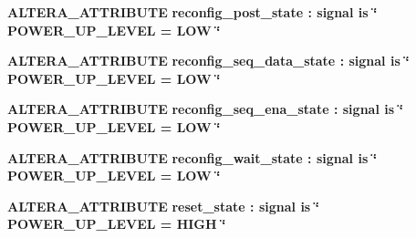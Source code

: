 \begin{DoxyCompactItemize}
\item 
{\bf A\+L\+T\+E\+R\+A\+\_\+\+A\+T\+T\+R\+I\+B\+U\+TE} {\bfseries {\bfseries {\bf reconfig\+\_\+post\+\_\+state}} \textcolor{vhdlchar}{ }\textcolor{vhdlchar}{\+:}\textcolor{vhdlchar}{ }\textcolor{keywordflow}{signal}\textcolor{vhdlchar}{ }\textcolor{keywordflow}{is}\textcolor{vhdlchar}{ }\textcolor{vhdlchar}{ }\textcolor{vhdlchar}{ }\textcolor{vhdlchar}{ }\textcolor{keyword}{\char`\"{} P\+O\+W\+E\+R\+\_\+\+U\+P\+\_\+\+L\+E\+V\+E\+L = L\+O\+W \char`\"{}}\textcolor{vhdlchar}{ }} 
\item 
{\bf A\+L\+T\+E\+R\+A\+\_\+\+A\+T\+T\+R\+I\+B\+U\+TE} {\bfseries {\bfseries {\bf reconfig\+\_\+seq\+\_\+data\+\_\+state}} \textcolor{vhdlchar}{ }\textcolor{vhdlchar}{\+:}\textcolor{vhdlchar}{ }\textcolor{keywordflow}{signal}\textcolor{vhdlchar}{ }\textcolor{keywordflow}{is}\textcolor{vhdlchar}{ }\textcolor{vhdlchar}{ }\textcolor{vhdlchar}{ }\textcolor{vhdlchar}{ }\textcolor{keyword}{\char`\"{} P\+O\+W\+E\+R\+\_\+\+U\+P\+\_\+\+L\+E\+V\+E\+L = L\+O\+W \char`\"{}}\textcolor{vhdlchar}{ }} 
\item 
{\bf A\+L\+T\+E\+R\+A\+\_\+\+A\+T\+T\+R\+I\+B\+U\+TE} {\bfseries {\bfseries {\bf reconfig\+\_\+seq\+\_\+ena\+\_\+state}} \textcolor{vhdlchar}{ }\textcolor{vhdlchar}{\+:}\textcolor{vhdlchar}{ }\textcolor{keywordflow}{signal}\textcolor{vhdlchar}{ }\textcolor{keywordflow}{is}\textcolor{vhdlchar}{ }\textcolor{vhdlchar}{ }\textcolor{vhdlchar}{ }\textcolor{vhdlchar}{ }\textcolor{keyword}{\char`\"{} P\+O\+W\+E\+R\+\_\+\+U\+P\+\_\+\+L\+E\+V\+E\+L = L\+O\+W \char`\"{}}\textcolor{vhdlchar}{ }} 
\item 
{\bf A\+L\+T\+E\+R\+A\+\_\+\+A\+T\+T\+R\+I\+B\+U\+TE} {\bfseries {\bfseries {\bf reconfig\+\_\+wait\+\_\+state}} \textcolor{vhdlchar}{ }\textcolor{vhdlchar}{\+:}\textcolor{vhdlchar}{ }\textcolor{keywordflow}{signal}\textcolor{vhdlchar}{ }\textcolor{keywordflow}{is}\textcolor{vhdlchar}{ }\textcolor{vhdlchar}{ }\textcolor{vhdlchar}{ }\textcolor{vhdlchar}{ }\textcolor{keyword}{\char`\"{} P\+O\+W\+E\+R\+\_\+\+U\+P\+\_\+\+L\+E\+V\+E\+L = L\+O\+W \char`\"{}}\textcolor{vhdlchar}{ }} 
\item 
{\bf A\+L\+T\+E\+R\+A\+\_\+\+A\+T\+T\+R\+I\+B\+U\+TE} {\bfseries {\bfseries {\bf reset\+\_\+state}} \textcolor{vhdlchar}{ }\textcolor{vhdlchar}{\+:}\textcolor{vhdlchar}{ }\textcolor{keywordflow}{signal}\textcolor{vhdlchar}{ }\textcolor{keywordflow}{is}\textcolor{vhdlchar}{ }\textcolor{vhdlchar}{ }\textcolor{vhdlchar}{ }\textcolor{vhdlchar}{ }\textcolor{keyword}{\char`\"{} P\+O\+W\+E\+R\+\_\+\+U\+P\+\_\+\+L\+E\+V\+E\+L = H\+I\+G\+H \char`\"{}}\textcolor{vhdlchar}{ }} 

\end{DoxyCompactItemize}
